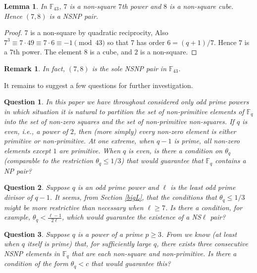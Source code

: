 \documentclass[12pt]{amsart}
\newtheorem{lemma}[thm]{Lemma}
\newtheorem{remark}{Remark}[section]
\newtheorem{question}{Question}[section]
\numberwithin{equation}{section}
\newcommand{\F}{\mathbb{F}_q}
\begin{document}
\begin{lemma} \label{case43}
In $\mathbb{F}_{43}$, $7$ is a non-square $7$th power and $8$ is a non-square cube.  Hence $(7,8)$ is a NSNP pair.
\end{lemma}

\begin{proof}
7 is a non-square by quadratic reciprocity,  Also $7^3\equiv 7\cdot 49  \equiv 7\cdot 6 \equiv -1 \pmod{43}$ so that 7 has order $6=(q+1)/7$. Hence $7$ is a $7$th power. 
The element $8$ is a cube, and $2$ is a non-square.
\end{proof}
\begin{remark}
\textnormal{In fact, $(7,8)$ is the sole NSNP pair in $\mathbb{F}_{43}$.}
\end{remark}

\bigskip
It remains to suggest a few questions for further investigation.

\begin{question}

\textnormal{In this paper we have throughout considered only odd prime powers in which situation it is natural to partition the set of non-primitive elements of  $\F$ into the set of non-zero squares and the set of non-primitive non-squares.  If $q$ is even, i.e., a power of $2$, then (more simply)  every non-zero element is either primitive or non-primitive. 
At one extreme, when $q-1$ is prime, all non-zero elements except $1$ are primitive.   When $q$ is even,  is there a condition on $\theta_q$  (comparable to the restriction $\theta_q \le 1/3$) that would guarantee that $\F$ contains a NP pair?}
\end{question}

\medskip
\begin{question}
\textnormal{Suppose $q$ is an odd prime power and $\ell$ is the least odd prime divisor of $q-1$.  It seems, from Section \ref{bigL}, that the conditions that $\theta_q \le 1/3$ might be more restrictive than necessary when $\ell \ge7$.  Is there a condition, for example, $\displaystyle{\theta_q<\frac{\ell-1}{2\ell}}$, which would guarantee the existence of a NS$\ell$ pair? }
\end{question}

\medskip

\begin{question}
\textnormal{Suppose $q$ is  a power of a prime $p\ge3$. From \cite{GLRST2007} we know (at least when $q$ itself  is prime)  that, for sufficiently large $q$,  there exists  
three consecutive NSNP elements in $\F$ that are each non-square and non-primitive.   Is there a condition of the form  $\theta_q<c$ that would guarantee this?
}

\end{question}
 
\end{document}
